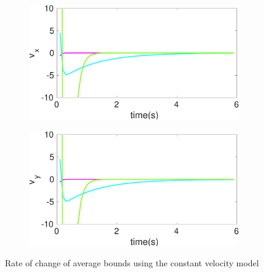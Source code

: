 \begin{figure}[!h]
\begin{subfigure}{.5\linewidth}
\end{subfigure}
\begin{subfigure}{.5\linewidth}
\centering
\includegraphics[width=\linewidth]{figures/BoundChange/CV/cv_bound_changev_x}
\end{subfigure}
\begin{subfigure}{.5\linewidth}
\centering
\includegraphics[width=\linewidth]{figures/BoundChange/CV/cv_bound_changev_y}
\end{subfigure}
\caption{Rate of change of average bounds using the constant velocity model}
\end{figure}

